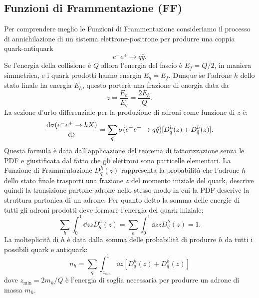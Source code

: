     \subsection{Funzioni di Frammentazione (FF)}
        Per comprendere meglio le Funzioni di Frammentazione consideriamo il processo di annichilazione di un sistema elettrone-positrone per produrre una coppia quark-antiquark~\cite{Vogt_2007}
        \begin{equation*}
            e^- e^+ \to q \bar{q}.
        \end{equation*}
        Se l'energia della collisione è $Q$ allora l'energia del fascio è $E_f = Q/2$, in maniera simmetrica, e i quark prodotti hanno energia $E_q = E_f$. Dunque se l'adrone $h$ dello stato finale ha energia $E_h$, questo porterà una frazione di energia data da
        \begin{equation*}
            z = \frac{E_h}{E_q} = \frac{2 E_h}{Q}.
        \end{equation*}
        La sezione d'urto differenziale per la produzione di adroni come funzione di $z$ è:
        \begin{equation*}
            \dv{\sigma(e^- e^+ \to h X)}{z} = \sum_{q}{\sigma(e^ -e^+ \to q \bar{q})[D_{q}^{h}(z) + D_{\bar{q}}^{h}(z)]}.
        \end{equation*}
        Questa formula è data dall'applicazione del teorema di fattorizzazione senza le PDF e giustificata dal fatto che gli elettroni sono particelle elementari. La Funzione di Frammentazione $D_{q}^{h}(z)$ rappresenta la probabilità che l'adrone $h$ dello stato finale trasporti una frazione $z$ del momento iniziale del quark, descrive quindi la transizione partone-adrone nello stesso modo in cui la PDF descrive la struttura partonica di un adrone. Per quanto detto la somma delle energie di tutti gli adroni prodotti deve formare l'energia del quark iniziale:
        \begin{equation*}
            \sum_{h}{\int_{0}^{1}{\dd{z} z D_{q}^{h}(z)}} = \sum_{h}{ \int_{0}^{1}{\dd{z} z D_{\bar{q}}^{h}(z)}} = 1.
        \end{equation*}
        La molteplicità di $h$ è data dalla somma delle probabilità di produrre $h$ da tutti i possibili quark e antiquark:
        \begin{equation*}
            n_{h} = \sum_{q}{\int_{z_{\min}}^{1} \dd{z} [D_{q}^{h}(z) + D_{\bar{q}}^{h}(z)]}
        \end{equation*}
        dove $z_{\min} = 2 m_{h} / Q$ è l'energia di soglia necessaria per produrre un adrone di massa $m_{h}$.

